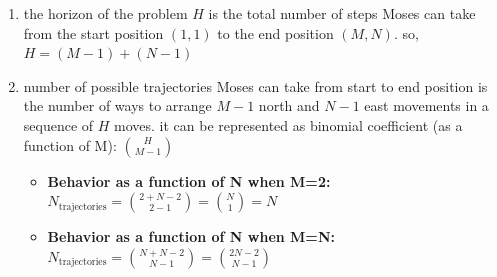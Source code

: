 \documentclass{assignmeownt}
\begin{document}
\begin{enumerate}
\begin{itemize}
    \end{itemize} %
    
  \item the horizon of the problem $H$ is the total number of steps Moses can take from the start position $(1,1)$ to the end position $(M,N)$.
  \newline
  so, $H = (M-1) + (N-1)$ 
  \item number of possible trajectories Moses can take from start to end position is the number of ways to arrange $M-1$ north and $N-1$ east movements in a sequence of $H$ moves.
  it can be represented as binomial coefficient (as a function of M):
    \begin{math}
        \binom{H}{M-1}
    \end{math}
    \begin{itemize} %
        \item \textbf{Behavior as a function of N when M=2:}
        \newline
        \begin{math}
            N_{\text{trajectories}} = \binom{2+N-2}{2-1} = \binom{N}{1} = N
        \end{math}
        \item \textbf{Behavior as a function of N when M=N:}
        \newline
        \begin{math}
            N_{\text{trajectories}} = \binom{N+N-2}{N-1} = \binom{2N-2}{N-1}
        \end{math}
    \end{itemize} %


\end{enumerate}
\end{document}
